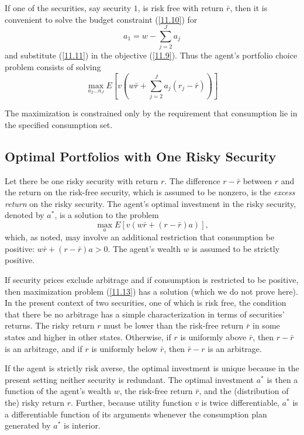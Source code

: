 \documentclass[\topdir/lecture\_notes.tex]{subfiles}
\begin{document}
If one of the securities, say security $1$, is risk free with return $\bar{r}$, then it is convenient to solve the budget constraint (\ref{11.10}) for
\begin{equation}
a_{1}=w-\sum_{j=2}^{J} a_{j} \label{11.11}
\end{equation}
and substitute (\ref{11.11}) in the objective (\ref{11.9}). Thus the agent's portfolio choice problem consists of solving
\begin{equation}
\max_{a_{2} \ldots a_{J}} E\left[v\left(w \bar{r}+\sum_{j=2}^{J} a_{j}(r_{j}-\bar{r})\right)\right] \label{eq:portfolio_choice_excess_returns} 
\end{equation}

The maximization is constrained only by the requirement that consumption lie in the specified consumption set.

\subsection{Optimal Portfolios with One Risky Security}
Let there be one risky security with return $r$. The difference $r-\bar{r}$ between $r$ and the return on the risk-free security, which is assumed to be nonzero, is the \emph{excess return} on the risky security. The agent's optimal investment in the risky security, denoted by $a^{*}$, is a solution to the problem
\begin{equation}
\max _{a} E[v(w \bar{r}+(r-\bar{r}) a)], \label{11.13}
\end{equation}
which, as noted, may involve an additional restriction that consumption be positive: $w \bar{r}+(r-\bar{r}) a > 0$. The agent's wealth $w$ is assumed to be strictly positive.

If security prices exclude arbitrage and if consumption is restricted to be positive, then maximization problem (\ref{11.13}) has a solution (which we do not prove here). In the present context of two securities, one of which is risk free, the condition that there be no arbitrage has a simple characterization in terms of securities' returns. The risky return $r$ must be lower than the risk-free return $\bar{r}$ in some states and higher in other states. Otherwise, if $r$ is uniformly above $\bar{r}$, then $r-\bar{r}$ is an arbitrage, and if $r$ is uniformly below $\bar{r}$, then $\bar{r}-r$ is an arbitrage.

If the agent is strictly risk averse, the optimal investment is unique because in the present setting neither security is redundant. The optimal investment $a^{*}$ is then a function of the agent's wealth $w$, the risk-free return $\bar{r}$, and the (distribution of the) risky return $r$. Further, because utility function $v$ is twice differentiable, $a^{*}$ is a differentiable function of its arguments whenever the consumption plan generated by $a^{*}$ is interior.
\end{document}
